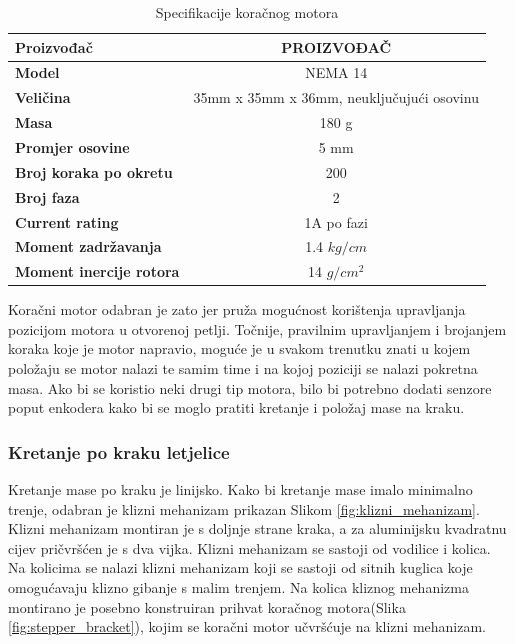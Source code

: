 \documentclass[11pt,a4paper]{article}
\begin{document}
\begin{table}[H]
	\centering
	\caption{Specifikacije koračnog motora }
	\label{tab:specifikacija_steppera}
	\begin{tabular}{|l|c|}
		\hline
		\textbf{Proizvođač} &PROIZVOĐAČ \\ \hline 
		\textbf{Model} & NEMA 14  \\ \hline 
		\textbf{Veličina} & 35mm x 35mm x 36mm, neuključujući osovinu  \\ \hline 
		\textbf{Masa} & 180 g  \\ \hline 
		\textbf{Promjer osovine} & 5 mm \\ \hline 
		\textbf{Broj koraka po okretu} & 200 \\ \hline 
		\textbf{Broj faza} & 2 \\ \hline 
		\textbf{Current rating} & 1A po fazi \\ \hline 
		\textbf{Moment zadržavanja} & 1.4 $kg/cm$ \\ \hline 
		\textbf{Moment inercije rotora} & 14 $g/cm^2$ \\ \hline 
	\end{tabular}
\end{table}

Koračni motor odabran je zato jer pruža mogućnost korištenja upravljanja pozicijom motora u otvorenoj petlji. Točnije, pravilnim upravljanjem i brojanjem koraka koje je motor napravio, moguće je u svakom trenutku znati u kojem položaju se motor nalazi te samim time i na kojoj poziciji se nalazi pokretna masa. Ako bi se koristio neki drugi tip motora, bilo bi potrebno dodati senzore poput enkodera kako bi se moglo pratiti kretanje i položaj mase na kraku.




\subsubsection{Kretanje po kraku letjelice}

Kretanje mase po kraku je linijsko. Kako bi kretanje mase imalo minimalno trenje, odabran je klizni mehanizam prikazan Slikom \ref{fig:klizni_mehanizam}. Klizni mehanizam montiran je s doljnje strane kraka, a za aluminijsku kvadratnu cijev pričvršćen je s dva vijka. Klizni mehanizam se sastoji od vodilice i kolica. Na kolicima se nalazi klizni mehanizam koji se sastoji od sitnih kuglica koje omogućavaju klizno gibanje s malim trenjem. Na kolica kliznog mehanizma montirano je posebno konstruiran prihvat koračnog motora(Slika \ref{fig:stepper_bracket}), kojim se koračni motor učvršćuje na klizni mehanizam.
\end{document}
